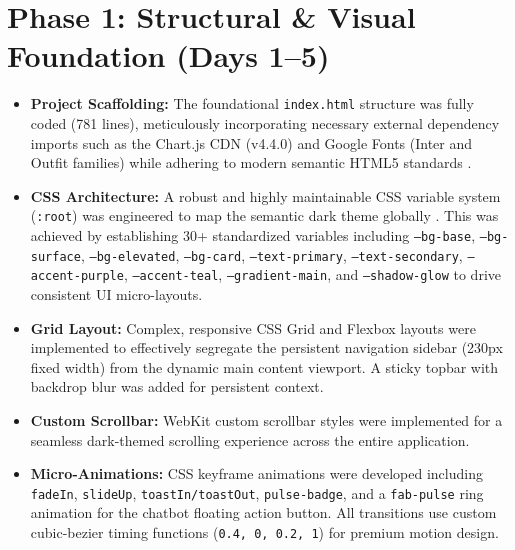 \documentclass{book}
\begin{document}
\section{Phase 1: Structural \& Visual Foundation (Days 1--5)}
\begin{itemize}
    \item \textbf{Project Scaffolding:} The foundational \texttt{index.html} structure was fully coded (781 lines), meticulously incorporating necessary external dependency imports such as the Chart.js CDN (v4.4.0) \cite{chartjs2024} and Google Fonts \cite{googlefonts2024} (Inter and Outfit families) while adhering to modern semantic HTML5 standards \cite{w3chtml5}.
    \item \textbf{CSS Architecture:} A robust and highly maintainable CSS variable system (\texttt{:root}) was engineered to map the semantic dark theme globally \cite{w3ccssprop2024}. This was achieved by establishing 30+ standardized variables including \texttt{--bg-base}, \texttt{--bg-surface}, \texttt{--bg-elevated}, \texttt{--bg-card}, \texttt{--text-primary}, \texttt{--text-secondary}, \texttt{--accent-purple}, \texttt{--accent-teal}, \texttt{--gradient-main}, and \texttt{--shadow-glow} to drive consistent UI micro-layouts.
    \item \textbf{Grid Layout:} Complex, responsive CSS Grid and Flexbox layouts \cite{mdn2024cssgrid} were implemented to effectively segregate the persistent navigation sidebar (230px fixed width) from the dynamic main content viewport. A sticky topbar with backdrop blur was added for persistent context.
    \item \textbf{Custom Scrollbar:} WebKit custom scrollbar styles were implemented for a seamless dark-themed scrolling experience across the entire application.
    \item \textbf{Micro-Animations:} CSS keyframe animations were developed including \texttt{fadeIn}, \texttt{slideUp}, \texttt{toastIn/toastOut}, \texttt{pulse-badge}, and a \texttt{fab-pulse} ring animation for the chatbot floating action button. All transitions use custom cubic-bezier timing functions (\texttt{0.4, 0, 0.2, 1}) for premium motion design.
\end{itemize}
\end{document}
